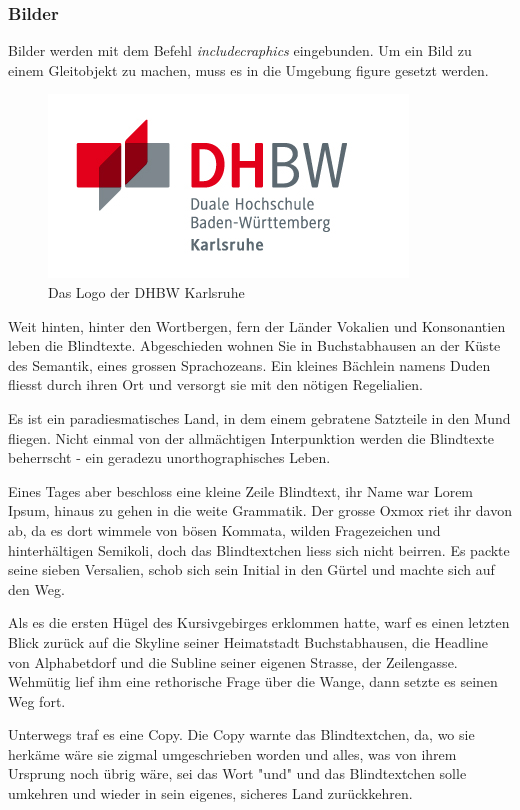 \subsubsection{Bilder}

Bilder werden mit dem Befehl \textit{\bs includecraphics} eingebunden. Um ein Bild zu einem Gleitobjekt zu machen, muss es in die Umgebung figure gesetzt werden.

\begin{figure}[hbt]
\centering
\includegraphics[scale=2.0]{Bilder/logo_dhbw}
\caption{Das Logo der DHBW Karlsruhe}
\end{figure}

Weit hinten, hinter den Wortbergen, fern der Länder Vokalien und Konsonantien leben die Blindtexte. Abgeschieden wohnen Sie in Buchstabhausen an der Küste des Semantik, eines grossen Sprachozeans. Ein kleines Bächlein namens Duden fliesst durch ihren Ort und versorgt sie mit den nötigen Regelialien.

Es ist ein paradiesmatisches Land, in dem einem gebratene Satzteile in den Mund fliegen. Nicht einmal von der allmächtigen Interpunktion werden die Blindtexte beherrscht - ein geradezu unorthographisches Leben.

Eines Tages aber beschloss eine kleine Zeile Blindtext, ihr Name war Lorem Ipsum, hinaus zu gehen in die weite Grammatik. Der grosse Oxmox riet ihr davon ab, da es dort wimmele von bösen Kommata, wilden Fragezeichen und hinterhältigen Semikoli, doch das Blindtextchen liess sich nicht beirren. Es packte seine sieben Versalien, schob sich sein Initial in den Gürtel und machte sich auf den Weg.

Als es die ersten Hügel des Kursivgebirges erklommen hatte, warf es einen letzten Blick zurück auf die Skyline seiner Heimatstadt Buchstabhausen, die Headline von Alphabetdorf und die Subline seiner eigenen Strasse, der Zeilengasse. Wehmütig lief ihm eine rethorische Frage über die Wange, dann setzte es seinen Weg fort.

Unterwegs traf es eine Copy. Die Copy warnte das Blindtextchen, da, wo sie herkäme wäre sie zigmal umgeschrieben worden und alles, was von ihrem Ursprung noch übrig wäre, sei das Wort "und" und das Blindtextchen solle umkehren und wieder in sein eigenes, sicheres Land zurückkehren.



